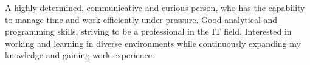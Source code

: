 %
%
%
\par{
A highly determined, communicative and curious person, who has the capability to
manage time and work efficiently under pressure. Good analytical and
programming skills, striving to be a professional in the IT field.
Interested in working and learning in diverse environments while
continuously expanding my knowledge and gaining work experience.
}